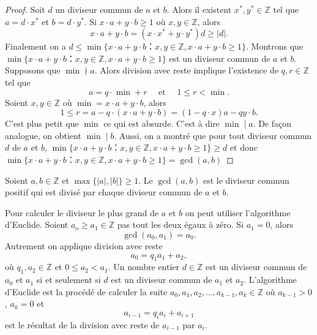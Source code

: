 \begin{proof}
  Soit $d$ un diviseur commun de $a$ et $b$. Alors il existent $x^*, y^* ∈ℤ$ tel que $a = d⋅x^*$ et $b = d ⋅y^*$. Si $x ⋅a + y ⋅ b≥1$ où $x,y ∈ℤ$, alors
  \begin{displaymath}
    x ⋅a + y ⋅ b = (x ⋅x^* + y ⋅ y^*)  d ≥ |d|. 
  \end{displaymath}
  Finalement on a  $d \le \min\{ x ⋅a + y ⋅ b： x,y ∈ℤ,  x ⋅a + y ⋅ b≥1\}$.
 Montrons que $\min\{ x ⋅a + y ⋅ b： x,y ∈ℤ,  x ⋅a + y ⋅ b≥1\}$ est un diviseur commun de $a$ et $b$. Supposons que $\min \nmid a$. Alors
  division avec reste implique l'existence de $q,r ∈ℤ$ tel que  
  \begin{displaymath}
    a = q ⋅ \min + r \quad \text{ et } \quad 1 \leq r < \min.
  \end{displaymath}
  Soient $x,y ∈ℤ$ où $\min = x ⋅a + y ⋅b$, alors
  \begin{displaymath}
    1 ≤ r = a - q ⋅ (x ⋅a + y ⋅b) = (1-q⋅x) a - qy ⋅b.
  \end{displaymath}
  C'est plus petit que $\min$ ce qui est absurde. C'est à dire $\min \mid a$. De façon analogue, on obtient $\min \mid b$.
  Aussi, on a montré que pour tout diviseur commun $d$ de $a$ et $b$, $\min\{ x ⋅a + y ⋅ b： x,y ∈ℤ,  x ⋅a + y ⋅ b≥1\}\geq d$ et donc $\min\{ x ⋅a + y ⋅ b： x,y ∈ℤ,  x ⋅a + y ⋅ b≥1\}= \gcd(a,b)$
  
\end{proof}



\begin{corollary}
  \label{co:5}
  Soient $a,b ∈ℤ$ et $\max\{|a|,|b|\} ≥1$. Le $\gcd(a,b)$ est le diviseur commun  positif qui est divisé par chaque diviseur commun de $a$ et $b$. 
\end{corollary}

Pour calculer le diviseur le plus grand de $a$ et $b$ on peut utiliser l'algorithme d'Euclide. Soient $a_o≥a_1 ∈ℤ$ pas tout les deux égaux à zéro. Si $a_1 = 0$, alors
\begin{displaymath}
\gcd(a_0,a_1) =   a_0. 
\end{displaymath}
Autrement on applique division avec reste
\begin{displaymath}
  a_0 = q_1 a_1 + a_2, 
\end{displaymath}
où $q_1,a_2 ∈ℤ$ et $0 ≤ a_2<a_1$. Un nombre entier $d ∈ℤ$ est un diviseur commun de $a_0$ et $a_1$ si et seulement si $d$ est un diviseur commun de $a_1$ et $a_2$. L'algorithme d'Euclide est la procédé de calculer la suite $a_0,a_1,a_2,\dots,a_{k-1},a_k ∈ℤ$  où $a_{k-1}>0$, $a_k=0$ et 
\begin{displaymath}
  a_{i-1} = q_i a_i + a_{i+1} 
\end{displaymath}
est le résultat de la division avec reste de $a_{i-1} $ par $a_i$. 

